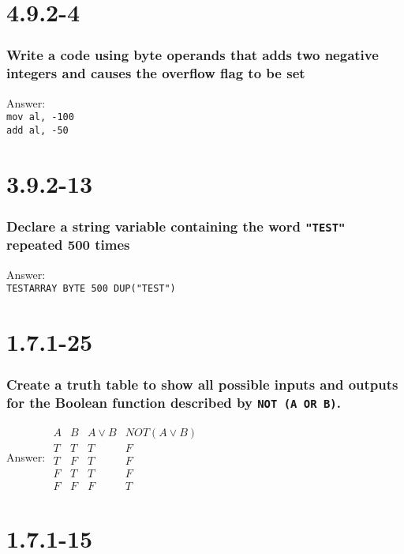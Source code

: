 \documentclass[12pt]{article}
\begin{document}
\section{4.9.2-4}
\subsubsection*{Write a code using byte operands that adds two negative integers and causes the overflow flag to be set}
Answer: \\
\texttt{mov al, -100 \\
	add al, -50 }
\section{3.9.2-13}
\subsubsection*{Declare a string variable containing the word \texttt{"TEST"} repeated 500 times}
Answer: \\
\texttt{TESTARRAY BYTE 500 DUP("TEST")}
\section{1.7.1-25}
\subsubsection*{Create a truth table to show all possible inputs and outputs for the Boolean function described by \texttt{NOT (A OR B)}.}
Answer: \newline \newline
$
\begin{array}{c|c|c|c}
	A & B & A \lor B & NOT (A \lor B)
	\\\hline
	T & T & T & F\\
	T & F & T & F\\
	F & T & T & F\\
	F & F & F & T
	
\end{array}$

\section{1.7.1-15}
\end{document}
